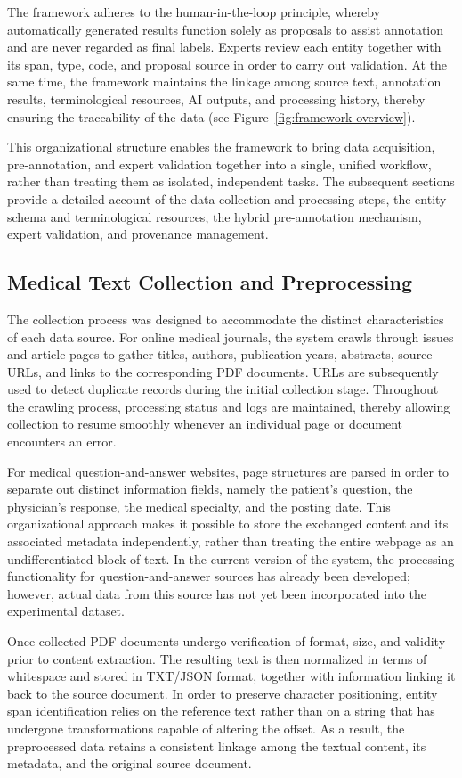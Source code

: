 \documentclass[runningheads]{llncs}
\begin{document}
The framework adheres to the human-in-the-loop principle, whereby automatically generated results function solely as proposals to assist annotation and are never regarded as final labels. Experts review each entity together with its span, type, code, and proposal source in order to carry out validation. At the same time, the framework maintains the linkage among source text, annotation results, terminological resources, AI outputs, and processing history, thereby ensuring the traceability of the data (see Figure~\ref{fig:framework-overview}).

This organizational structure enables the framework to bring data acquisition, pre-annotation, and expert validation together into a single, unified workflow, rather than treating them as isolated, independent tasks. The subsequent sections provide a detailed account of the data collection and processing steps, the entity schema and terminological resources, the hybrid pre-annotation mechanism, expert validation, and provenance management.

\subsection{Medical Text Collection and Preprocessing}
The collection process was designed to accommodate the distinct characteristics of each data source. For online medical journals, the system crawls through issues and article pages to gather titles, authors, publication years, abstracts, source URLs, and links to the corresponding PDF documents. URLs are subsequently used to detect duplicate records during the initial collection stage. Throughout the crawling process, processing status and logs are maintained, thereby allowing collection to resume smoothly whenever an individual page or document encounters an error.

For medical question-and-answer websites, page structures are parsed in order to separate out distinct information fields, namely the patient's question, the physician's response, the medical specialty, and the posting date. This organizational approach makes it possible to store the exchanged content and its associated metadata independently, rather than treating the entire webpage as an undifferentiated block of text. In the current version of the system, the processing functionality for question-and-answer sources has already been developed; however, actual data from this source has not yet been incorporated into the experimental dataset.

Once collected PDF documents undergo verification of format, size, and validity prior to content extraction. The resulting text is then normalized in terms of whitespace and stored in TXT/JSON format, together with information linking it back to the source document. In order to preserve character positioning, entity span identification relies on the reference text rather than on a string that has undergone transformations capable of altering the offset. As a result, the preprocessed data retains a consistent linkage among the textual content, its metadata, and the original source document.
\end{document}
